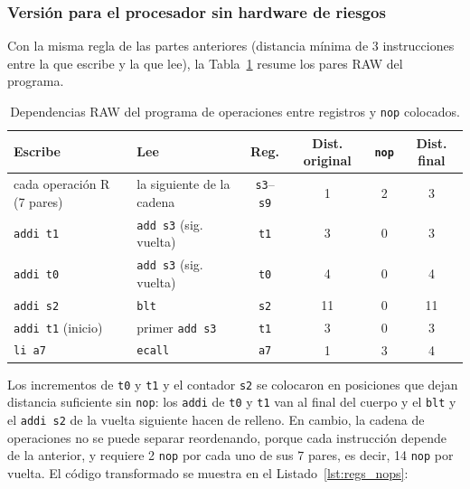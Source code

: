 \documentclass[11pt,a4paper]{article}
\begin{document}
\subsubsection{Versi\'on para el procesador sin hardware de riesgos}

Con la misma regla de las partes anteriores (distancia m\'inima de 3
instrucciones entre la que escribe y la que lee), la
Tabla~\ref{tab:dependencias3} resume los pares RAW del programa.

\begin{table}[h]
  \centering
  \small
  \begin{tabular}{@{}llcccc@{}}
    \toprule
    Escribe & Lee & Reg. & Dist. original & \texttt{nop} & Dist. final \\
    \midrule
    cada operaci\'on R (7 pares) & la siguiente de la cadena & \texttt{s3}--\texttt{s9} & 1 & 2 & 3 \\
    \texttt{addi t1}         & \texttt{add s3} (sig. vuelta) & \texttt{t1} & 3 & 0 & 3 \\
    \texttt{addi t0}         & \texttt{add s3} (sig. vuelta) & \texttt{t0} & 4 & 0 & 4 \\
    \texttt{addi s2}         & \texttt{blt}                  & \texttt{s2} & 11 & 0 & 11 \\
    \texttt{addi t1} (inicio) & primer \texttt{add s3}       & \texttt{t1} & 3 & 0 & 3 \\
    \texttt{li a7}           & \texttt{ecall}                & \texttt{a7} & 1 & 3 & 4 \\
    \bottomrule
  \end{tabular}
  \caption{Dependencias RAW del programa de operaciones entre registros y
  \texttt{nop} colocados.}
  \label{tab:dependencias3}
\end{table}

Los incrementos de \texttt{t0} y \texttt{t1} y el contador \texttt{s2} se
colocaron en posiciones que dejan distancia suficiente sin \texttt{nop}: los
\texttt{addi} de \texttt{t0} y \texttt{t1} van al final del cuerpo y el
\texttt{blt} y el \texttt{addi s2} de la vuelta siguiente hacen de relleno. En
cambio, la cadena de operaciones no se puede separar reordenando, porque cada
instrucci\'on depende de la anterior, y requiere 2 \texttt{nop} por cada uno de
sus 7 pares, es decir, 14 \texttt{nop} por vuelta. El c\'odigo transformado se muestra
en el Listado~\ref{lst:regs_nops}:
\end{document}
